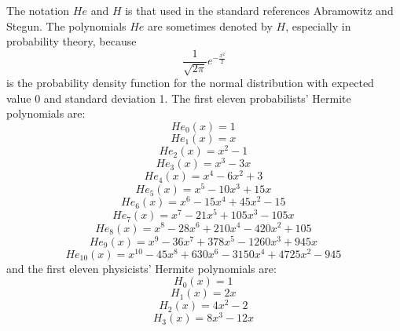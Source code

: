 The notation $\mathit{He}$ and $\mathit{H}$ is that used in the standard references Abramowitz and Stegun. 
The polynomials $\mathit{He}$  are sometimes denoted by $\mathit{H}$, especially in probability theory, because
\begin{equation}
\frac{1}{\sqrt{2\pi}}e^{-\frac{x^2}{2}}
\end{equation}
is the probability density function for the normal distribution with expected value 0 and standard deviation 1.
The first eleven probabilists' Hermite polynomials are:
\begin{equation}{\mathit{He}}_0(x)=1\,\end{equation}
\begin{equation}{\mathit{He}}_1(x)=x\,\end{equation}
\begin{equation}{\mathit{He}}_2(x)=x^2-1\,\end{equation}
\begin{equation}{\mathit{He}}_3(x)=x^3-3x\,\end{equation}
\begin{equation}{\mathit{He}}_4(x)=x^4-6x^2+3\,\end{equation}
\begin{equation}{\mathit{He}}_5(x)=x^5-10x^3+15x\,\end{equation}
\begin{equation}{\mathit{He}}_6(x)=x^6-15x^4+45x^2-15\,\end{equation}
\begin{equation}{\mathit{He}}_7(x)=x^7-21x^5+105x^3-105x\,\end{equation}
\begin{equation}{\mathit{He}}_8(x)=x^8-28x^6+210x^4-420x^2+105\,\end{equation}
\begin{equation}{\mathit{He}}_9(x)=x^9-36x^7+378x^5-1260x^3+945x\,\end{equation}
\begin{equation}{\mathit{He}}_{10}(x)=x^{10}-45x^8+630x^6-3150x^4+4725x^2-945\,\end{equation}
and the first eleven physicists' Hermite polynomials are:
\begin{equation}H_0(x)=1\,\end{equation}
\begin{equation}H_1(x)=2x\,\end{equation}
\begin{equation}H_2(x)=4x^2-2\,\end{equation}
\begin{equation}H_3(x)=8x^3-12x\,\end{equation}
